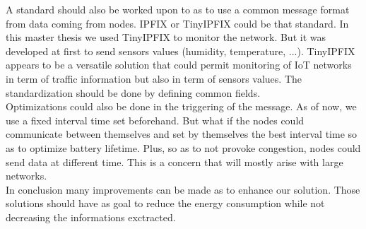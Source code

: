 A standard should also be worked upon to as to use a common message format from data coming from nodes. IPFIX or TinyIPFIX could be that standard. In this master thesis we used TinyIPFIX to monitor the network. But it was developed at first to send sensors values (humidity, temperature, ...). TinyIPFIX appears to be a versatile solution that could permit monitoring of IoT networks in term of traffic information but also in term of sensors values. The standardization should be done by defining common fields.\\

Optimizations could also be done in the triggering of the message. As of now, we use a fixed interval time set beforehand. But what if the nodes could communicate between themselves and set by themselves the best interval time so as to optimize battery lifetime. Plus, so as to not provoke congestion, nodes could send data at different time. This is a concern that will mostly arise with large networks.\\

In conclusion many improvements can be made as to enhance our solution. Those solutions should have as goal to reduce the energy consumption while not decreasing the informations exctracted.
